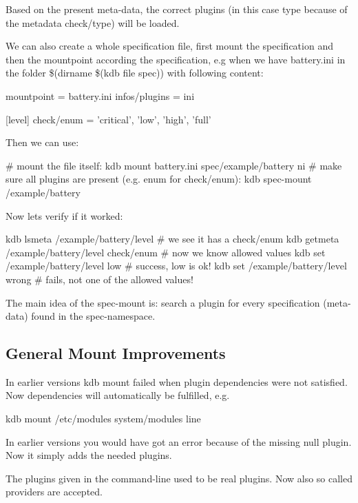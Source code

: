 Based on the present meta-\/data, the correct plugins (in this case {\ttfamily type} because of the metadata {\ttfamily check/type}) will be loaded.

We can also create a whole specification file, first mount the specification and then the mountpoint according the specification, e.\+g when we have {\ttfamily battery.\+ini} in the folder {\ttfamily \$(dirname \$(kdb file spec))} with following content\+: \begin{DoxyVerb}    []
    mountpoint = battery.ini
    infos/plugins = ini

    [level]
    check/enum = 'critical', 'low', 'high', 'full'
\end{DoxyVerb}


Then we can use\+: \begin{DoxyVerb}    # mount the file itself:
    kdb mount battery.ini spec/example/battery ni
    # make sure all plugins are present (e.g. enum for check/enum):
    kdb spec-mount /example/battery
\end{DoxyVerb}


Now lets verify if it worked\+: \begin{DoxyVerb}    kdb lsmeta /example/battery/level
    # we see it has a check/enum
    kdb getmeta /example/battery/level check/enum
    # now we know allowed values
    kdb set /example/battery/level low
    # success, low is ok!
    kdb set /example/battery/level wrong
    # fails, not one of the allowed values!
\end{DoxyVerb}


The main idea of the spec-\/mount is\+: search a plugin for every specification (meta-\/data) found in the spec-\/namespace.

\subsection*{General Mount Improvements}

In earlier versions {\ttfamily kdb mount} failed when plugin dependencies were not satisfied. Now dependencies will automatically be fulfilled, e.\+g. \begin{DoxyVerb}    kdb mount /etc/modules system/modules line
\end{DoxyVerb}


In earlier versions you would have got an error because of the missing {\ttfamily null} plugin. Now it simply adds the needed plugins.

The plugins given in the command-\/line used to be real plugins. Now also so called providers are accepted.

